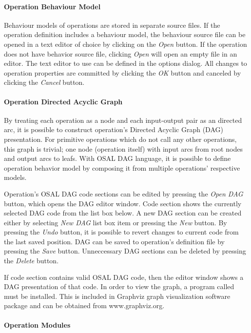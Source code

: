 \documentclass[twoside]{tceusermanual}
\begin{document}
\paragraph{Operation Behaviour Model}

Behaviour models of operations are stored in separate source files.  If the
operation definition includes a behaviour model, the behaviour source file
can be opened in a text editor of choice by clicking on the \emph{Open}
button. If the operation does not have behavior source file, clicking
\emph{Open} will open an empty file in an editor. The text editor to use can
be defined in the options dialog. All changes to operation properties are 
committed by clicking the \emph{OK} button and canceled by clicking the \emph{Cancel} 
button.

\paragraph{Operation Directed Acyclic Graph}

By treating each operation as a node and each input-output pair as an directed
arc, it is possible to construct operation's Directed Acyclic Graph (DAG)
presentation. For primitive operations which do not call any other operations,
this graph is trivial; one node (operation itself) with input arcs from root
nodes and output arcs to leafs. With OSAL DAG language, it is possible to
define operation behavior model by composing it from multiple operations'
respective models.

Operation's OSAL DAG code sections can be edited by pressing the \emph{Open DAG}
button, which opens the DAG editor window. Code section shows the currently
selected DAG code from the list box below. A new DAG section can be created
either by selecting \emph{New DAG} list box item or pressing the \emph{New} button.
By pressing the \emph{Undo} button, it is possible to revert changes to current
code from the last saved position. DAG can be saved to operation's definition
file by pressing the \emph{Save} button. Unneccessary DAG sections can be deleted
by pressing the \emph{Delete} button.

If code section contains valid OSAL DAG code, then the editor window shows
a DAG presentation of that code.  In order to view the graph, a
program called  must be installed. This is included in Graphviz graph
visualization software package and can be obtained from www.graphviz.org. 

\paragraph{Operation Modules}
\end{document}
